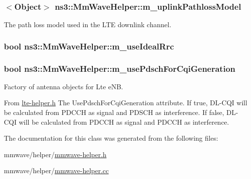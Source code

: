 \subsubsection[{\texorpdfstring{m\+\_\+uplink\+Pathloss\+Model}{m_uplinkPathlossModel}}]{$<${\bf Object}$>$ ns3\+::\+Mm\+Wave\+Helper\+::m\+\_\+uplink\+Pathloss\+Model\hspace{0.3cm}{\ttfamily [private]}}\hypertarget{classns3_1_1MmWaveHelper_a13bd21e36e3ef9f3c11aeca4eef3fc36}{}\label{classns3_1_1MmWaveHelper_a13bd21e36e3ef9f3c11aeca4eef3fc36}


The path loss model used in the L\+TE downlink channel. 

\subsubsection[{\texorpdfstring{m\+\_\+use\+Ideal\+Rrc}{m_useIdealRrc}}]{\setlength{\rightskip}{0pt plus 5cm}bool ns3\+::\+Mm\+Wave\+Helper\+::m\+\_\+use\+Ideal\+Rrc\hspace{0.3cm}{\ttfamily [private]}}\hypertarget{classns3_1_1MmWaveHelper_ad41fdb2996a6f53385b146bb60f476dc}{}\label{classns3_1_1MmWaveHelper_ad41fdb2996a6f53385b146bb60f476dc}
\subsubsection[{\texorpdfstring{m\+\_\+use\+Pdsch\+For\+Cqi\+Generation}{m_usePdschForCqiGeneration}}]{\setlength{\rightskip}{0pt plus 5cm}bool ns3\+::\+Mm\+Wave\+Helper\+::m\+\_\+use\+Pdsch\+For\+Cqi\+Generation\hspace{0.3cm}{\ttfamily [private]}}\hypertarget{classns3_1_1MmWaveHelper_aa22c5cc230f1e0e6bfd280ed2b6f9635}{}\label{classns3_1_1MmWaveHelper_aa22c5cc230f1e0e6bfd280ed2b6f9635}


Factory of antenna objects for Lte e\+NB. 

From \hyperlink{lte-helper_8h}{lte-\/helper.\+h} The {\ttfamily Use\+Pdsch\+For\+Cqi\+Generation} attribute. If true, D\+L-\/\+C\+QI will be calculated from P\+D\+C\+CH as signal and P\+D\+S\+CH as interference. If false, D\+L-\/\+C\+QI will be calculated from P\+D\+C\+CH as signal and P\+D\+C\+CH as interference. 

The documentation for this class was generated from the following files\+:\begin{DoxyCompactItemize}
\item 
mmwave/helper/\hyperlink{mmwave-helper_8h}{mmwave-\/helper.\+h}\item 
mmwave/helper/\hyperlink{mmwave-helper_8cc}{mmwave-\/helper.\+cc}\end{DoxyCompactItemize}
